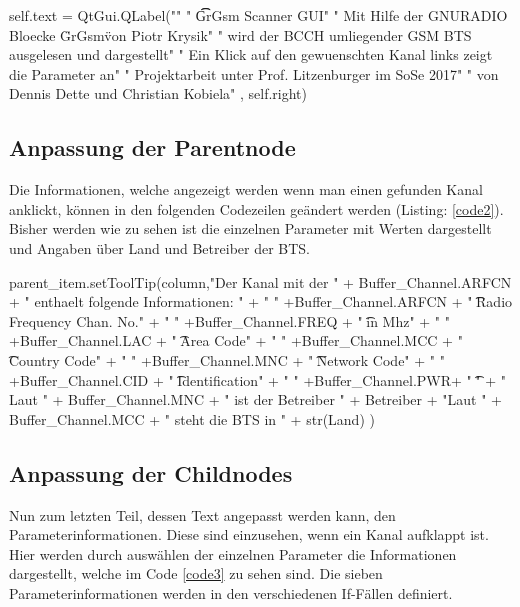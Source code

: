 \begin{code}[firstnumber=100,numbers=left,stepnumber=1, caption={Titelseite},captionpos=b,label={code1}]
self.text = QtGui.QLabel("\n"
                         " \t\t   GrGsm Scanner GUI\n\n\n"
                         " Mit Hilfe der GNURADIO Bloecke \"GrGsm\" von Piotr Krysik\n"
                         " wird der BCCH umliegender GSM BTS ausgelesen und dargestellt\n\n"
                         " Ein Klick auf den gewuenschten Kanal links zeigt die Parameter an\n\n\n\n\n\n\n\n\n\n\n"
                         " Projektarbeit unter Prof. Litzenburger im SoSe 2017\n"
                         " von Dennis Dette und Christian Kobiela\n\n"
                         , self.right)
\end{code} 
\noindent 

\subsection*{Anpassung der Parentnode}

Die Informationen, welche angezeigt werden wenn man einen gefunden Kanal anklickt, können in den folgenden Codezeilen geändert werden (Listing: \ref{code2}). Bisher werden wie zu sehen ist die einzelnen Parameter mit Werten dargestellt und Angaben über Land und Betreiber der BTS. 

\begin{code}[firstnumber=187,numbers=left,stepnumber=1, caption={Kanalinformation},captionpos=b,label={code2}]
parent_item.setToolTip(column,"Der Kanal mit der " + Buffer_Channel.ARFCN + 
		" enthaelt folgende Informationen: \n\n"
		+ " " +Buffer_Channel.ARFCN + " \t\tAbsolute Radio Frequency Chan. No.\n"
		+ " " +Buffer_Channel.FREQ + " \t\tFrequency in Mhz\n"
		+ " " +Buffer_Channel.LAC + " \t\tLocation Area Code\n"
		+ " " +Buffer_Channel.MCC + " \t\tMobile Country Code\n" 
		+ " " +Buffer_Channel.MNC + " \t\tMobile Network Code\n"
		+ " " +Buffer_Channel.CID + " \t\tCell Identification\n"			                        
		+ " " +Buffer_Channel.PWR+ " \t\tPower\n\n\n"
		+ " Laut " + Buffer_Channel.MNC + " ist der Betreiber " + Betreiber
		+ "\n Laut " + Buffer_Channel.MCC + " steht die BTS in " + str(Land)
		)
\end{code}

\subsection*{Anpassung der  Childnodes}

Nun zum letzten Teil, dessen Text angepasst werden kann, den Parameterinformationen. Diese sind einzusehen, wenn ein Kanal aufklappt ist. Hier werden durch auswählen der einzelnen Parameter die Informationen dargestellt, welche im Code \ref{code3} zu sehen sind. Die sieben Parameterinformationen werden in den verschiedenen If-Fällen definiert. 

